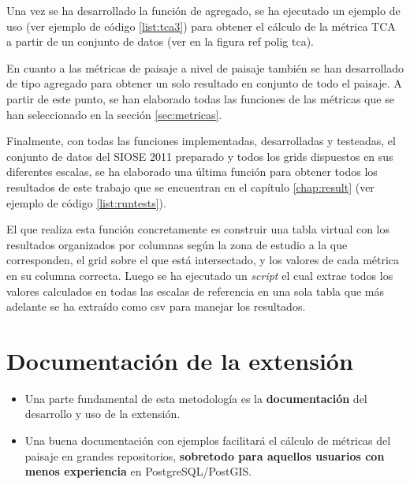 \label{list:tca2}

Una vez se ha desarrollado la función de agregado, se ha ejecutado un ejemplo de uso (ver ejemplo de código \ref{list:tca3}) para obtener el cálculo de la métrica TCA a partir de un conjunto de datos (ver en la figura ref polig tca).

\label{list:tca3}

En cuanto a las métricas de paisaje a nivel de paisaje también se han desarrollado de tipo agregado para obtener un solo resultado en conjunto de todo el paisaje. A partir de este punto, se han elaborado todas las funciones de las métricas que se han seleccionado en la sección \ref{sec:metricas}.

Finalmente, con todas las funciones implementadas, desarrolladas y testeadas, el conjunto de datos del SIOSE 2011 preparado y todos los grids dispuestos en sus diferentes escalas, se ha elaborado una última función para obtener todos los resultados de este trabajo que se encuentran en el capítulo \ref{chap:result} (ver ejemplo de código \ref{list:runtests}).

\label{list:runtests}

El que realiza esta función concretamente es construir una tabla virtual con los resultados organizados por columnas según la zona de estudio a la que corresponden, el grid sobre el que está intersectado, y los valores de cada métrica en su columna correcta. Luego se ha ejecutado un \textit{script} el cual extrae todos los valores calculados en todas las escalas de referencia en una sola tabla que más adelante se ha extraído como csv para manejar los resultados.


\section{Documentación de la extensión}

\begin{graybox}
\begin{itemize}
\item Una parte fundamental de esta metodología es la \textbf{documentación} del desarrollo y uso de la extensión. 
\item Una buena documentación con ejemplos facilitará el cálculo de métricas del paisaje en grandes repositorios, \textbf{sobretodo para aquellos usuarios con menos experiencia} en PostgreSQL/PostGIS.
\end{itemize}
\end{graybox}

